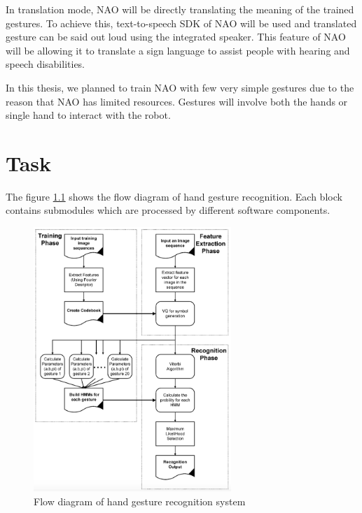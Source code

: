 In translation mode, NAO will be directly translating the meaning of the trained gestures. To achieve this, text-to-speech SDK of NAO will be used and translated gesture can be said out loud using the integrated speaker. This feature of NAO will be allowing it to translate a sign language to assist people with hearing and speech disabilities.

In this thesis, we planned to train NAO with few very simple gestures due to the reason that NAO has limited resources. Gestures will involve both the hands or single hand to interact with the robot.

\chapter{Task} The figure \ref{fig:flow} shows the flow diagram of hand gesture recognition. Each block contains submodules which are processed by different software components.
\begin{figure}
	[h] \centering 
	\includegraphics[height=10cm]{figures/flow.png} \caption{Flow diagram of hand gesture recognition system} \label{fig:flow} 
\end{figure}

